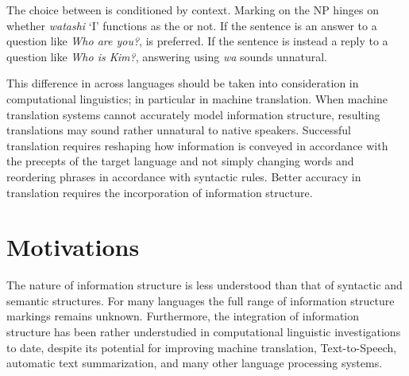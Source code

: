 

\noindent The choice between  is conditioned by
context. Marking on the NP hinges on whether \textit{watashi} `I'
functions as the  or not. If the sentence is an answer to a
question like \textit{Who are you?}, \wa is preferred. If the sentence
is instead a reply to a question like \textit{Who is Kim?}, answering
using \textit{wa} sounds unnatural.


This difference in  across languages should
be taken into consideration in computational linguistics; in particular
in machine translation.  When machine translation systems cannot
accurately model information structure, resulting translations may
sound rather unnatural to native speakers.  Successful translation
requires reshaping how information is conveyed in accordance with the
precepts of the target language and not simply changing words and
reordering phrases in accordance with syntactic rules. Better accuracy
in translation requires the incorporation of information structure.




\section{Motivations}
\label{1:sec:motivations}


The nature of information structure is less understood than that of
syntactic and semantic structures. For many languages the full range
of information structure markings remains unknown. Furthermore, the
integration of information structure has been rather understudied in
computational linguistic investigations to date, despite its potential
for improving machine translation, Text-to-Speech, automatic text
summarization, and many other language processing systems.



